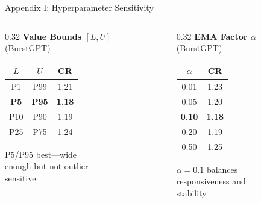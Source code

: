 \documentclass[aspectratio=169,10pt]{beamer}
\begin{document}
\begin{frame}[noframenumbering]
\hypertarget{app:hyper}{}{Appendix I: Hyperparameter Sensitivity}
\vspace{-0.2cm}
\begin{columns}[T]
\begin{column}{0.32\textwidth}
\footnotesize
\textbf{Value Bounds $[L, U]$}\\
\scriptsize (BurstGPT)

\vspace{0.1cm}
\begin{tabular}{@{}ccc@{}}
\toprule
$L$ & $U$ & CR \\
\midrule
P1 & P99 & 1.21 \\
\textbf{P5} & \textbf{P95} & \textbf{1.18} \\
P10 & P90 & 1.19 \\
P25 & P75 & 1.24 \\
\bottomrule
\end{tabular}

\vspace{0.1cm}
\scriptsize P5/P95 best---wide\\enough but not outlier-\\sensitive.
\end{column}

\begin{column}{0.32\textwidth}
\footnotesize
\textbf{EMA Factor $\alpha$}\\
\scriptsize (BurstGPT)

\vspace{0.1cm}
\begin{tabular}{@{}cc@{}}
\toprule
$\alpha$ & CR \\
\midrule
0.01 & 1.23 \\
0.05 & 1.20 \\
\textbf{0.10} & \textbf{1.18} \\
0.20 & 1.19 \\
0.50 & 1.25 \\
\bottomrule
\end{tabular}

\vspace{0.1cm}
\scriptsize $\alpha=0.1$ balances\\responsiveness and\\stability.
\end{column}


\end{columns}
\end{frame}
\end{document}
